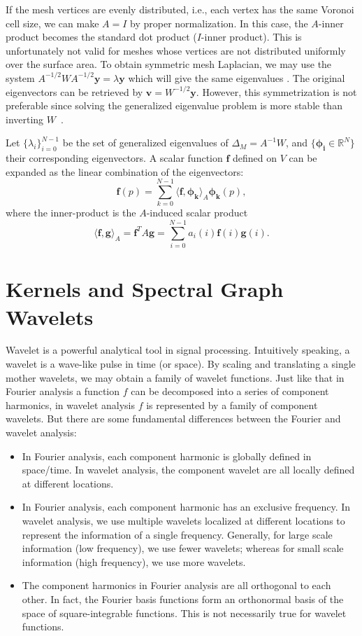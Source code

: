 If the mesh vertices are evenly distributed, i.e., each vertex has the same Voronoi cell size, we can make $A=I$ by proper normalization. In this case, the $A$-inner product becomes the standard dot product ($I$-inner product). This is unfortunately not valid for meshes whose vertices are not distributed uniformly over the surface area. To obtain symmetric mesh Laplacian, we may use the system $A^{-1/2}WA^{-1/2}\mathbf{y}=\lambda\mathbf{y}$ which will give the same eigenvalues \cite{Vallet2008}. The original eigenvectors can be retrieved by $\mathbf{v}=W^{-1/2}\mathbf{y}$. However, this symmetrization is not preferable since solving the generalized eigenvalue problem is more stable than inverting $W$~\cite{Reuter:CG:2009}.

Let $\{\lambda_i\}_{i=0}^{N-1}$ be the set of generalized eigenvalues of
 $\Delta_M=A^{-1}W$, and $\{\mathbf{\phi_i}\in\mathbb{R}^N\}$ their corresponding
eigenvectors. A scalar function $\mathbf{f}$ defined on $V$ can be expanded as
the linear combination of the eigenvectors:
\begin{equation}
\mathbf{f}(p)=\sum_{k=0}^{N-1}\langle \mathbf{f},\mathbf{\phi_k}\rangle_A \mathbf{\phi_k}(p),
\end{equation}
where the inner-product is the $A$-induced scalar product
\begin{equation}
\langle \mathbf{f},\mathbf{g}\rangle_A = \mathbf{f}^T A\mathbf{g}=\sum_{i=0}^{N-1}a_i(i)\mathbf{f}(i)\mathbf{g}(i).
\end{equation}

\section{Kernels and Spectral Graph Wavelets}
Wavelet is a powerful analytical tool in signal processing. Intuitively speaking, a
wavelet is a wave-like pulse in time (or space). By scaling and translating a single mother wavelets,
we may obtain a family of wavelet functions. Just like that in Fourier analysis a function $f$ can
be decomposed into a series of component harmonics, in wavelet analysis $f$ is represented by a family
of component wavelets. But there are some fundamental differences between the Fourier and wavelet analysis:

\begin{itemize}
\item In Fourier analysis, each component harmonic is globally defined in space/time. In wavelet analysis, the component wavelet are all locally defined at different locations.
\item In Fourier analysis, each component harmonic has an exclusive frequency. In wavelet analysis, we use multiple wavelets localized at different locations to represent the information of a single frequency. Generally, for large scale information (low frequency), we use fewer wavelets; whereas for small scale information (high frequency), we use more wavelets.
\item The component harmonics in Fourier analysis are all orthogonal to each other. In fact, the Fourier basis functions form an orthonormal basis of the space of square-integrable functions. This is not necessarily true for wavelet functions.
\end{itemize}

